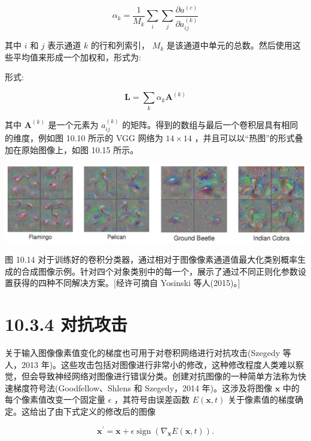 \documentclass[10pt]{article}
\begin{document}
\[
{\alpha }_{k} = \frac{1}{{M}_{k}}\mathop{\sum }\limits_{i}\mathop{\sum }\limits_{j}\frac{\partial {a}^{\left( c\right) }}{\partial {a}_{ij}^{\left( k\right) }} \tag{10.9}
\]

其中 \(i\) 和 \(j\) 表示通道 \(k\) 的行和列索引， \({M}_{k}\) 是该通道中单元的总数。然后使用这些平均值来形成一个加权和，形式为:

形式:

\[
\mathbf{L} = \mathop{\sum }\limits_{k}{\alpha }_{k}{\mathbf{A}}^{\left( k\right) } \tag{10.10}
\]

其中 \({\mathbf{A}}^{\left( k\right) }\) 是一个元素为 \({a}_{ij}^{\left( k\right) }\) 的矩阵。得到的数组与最后一个卷积层具有相同的维度，例如图 10.10 所示的 VGG 网络为 \({14} \times  {14}\) ，并且可以以“热图”的形式叠加在原始图像上，如图 10.15 所示。

\begin{center}
\includegraphics[max width=1.0\textwidth]{images/0194e279-9b28-703a-88f4-c3ac21e2010d_325_226_407_1297_339_0.jpg}
\end{center}
\hspace*{3em} 

图 10.14 对于训练好的卷积分类器，通过相对于图像像素通道值最大化类别概率生成的合成图像示例。针对四个对象类别中的每一个，展示了通过不同正则化参数设置获得的四种不同解决方案。[经许可摘自 Yosinski 等人(2015)。]

\section*{10.3.4 对抗攻击}

关于输入图像像素值变化的梯度也可用于对卷积网络进行对抗攻击(Szegedy 等人，2013 年)。这些攻击包括对图像进行非常小的修改，这种修改程度人类难以察觉，但会导致神经网络对图像进行错误分类。创建对抗图像的一种简单方法称为快速梯度符号法(Goodfellow、Shlens 和 Szegedy，2014 年)。这涉及将图像 \(\mathbf{x}\) 中的每个像素值改变一个固定量 \(\epsilon\) ，其符号由误差函数 \(E\left( {\mathbf{x},t}\right)\) 关于像素值的梯度确定。这给出了由下式定义的修改后的图像

\[
{\mathbf{x}}^{\prime } = \mathbf{x} + \epsilon \operatorname{sign}\left( {{\nabla }_{\mathbf{x}}E\left( {\mathbf{x},t}\right) }\right) . \tag{10.11}
\]
\end{document}

